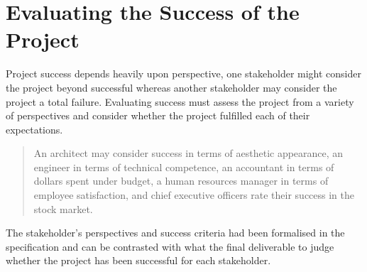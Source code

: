 \section[Evaluating the Success of the Project]{Evaluating the Success of the Project
}

Project success depends heavily upon perspective, one stakeholder might consider the project beyond successful whereas another stakeholder may consider the project a total failure. Evaluating success must assess the project from a variety of perspectives and consider whether the project fulfilled each of their expectations.

\begin{quote}
An architect may consider success in terms of aesthetic appearance, an engineer in terms of technical competence, an accountant in terms of dollars spent under budget, a human resources manager in terms of employee satisfaction, and chief executive officers rate their success in the stock market.
\end{quote}

The stakeholder's perspectives and success criteria had been formalised in the specification and can be contrasted with what the final deliverable to judge whether the project has been successful for each stakeholder.

